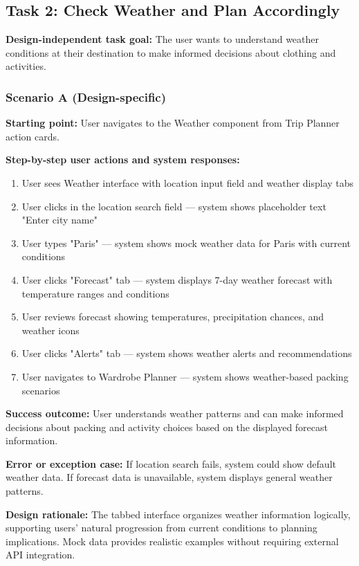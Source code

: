 \documentclass[11pt,a4paper]{article}
\begin{document}
\subsection*{Task 2: Check Weather and Plan Accordingly}

\textbf{Design-independent task goal:}
The user wants to understand weather conditions at their destination to make informed decisions about clothing and activities.

\subsubsection*{Scenario A (Design-specific)}

\textbf{Starting point:} User navigates to the Weather component from Trip Planner action cards.

\textbf{Step-by-step user actions and system responses:}
\begin{enumerate}
\item User sees Weather interface with location input field and weather display tabs
\item User clicks in the location search field — system shows placeholder text "Enter city name"
\item User types "Paris" — system shows mock weather data for Paris with current conditions
\item User clicks "Forecast" tab — system displays 7-day weather forecast with temperature ranges and conditions
\item User reviews forecast showing temperatures, precipitation chances, and weather icons
\item User clicks "Alerts" tab — system shows weather alerts and recommendations
\item User navigates to Wardrobe Planner — system shows weather-based packing scenarios
\end{enumerate}

\textbf{Success outcome:} User understands weather patterns and can make informed decisions about packing and activity choices based on the displayed forecast information.

\textbf{Error or exception case:} If location search fails, system could show default weather data. If forecast data is unavailable, system displays general weather patterns.

\textbf{Design rationale:} The tabbed interface organizes weather information logically, supporting users' natural progression from current conditions to planning implications. Mock data provides realistic examples without requiring external API integration.
\end{document}
